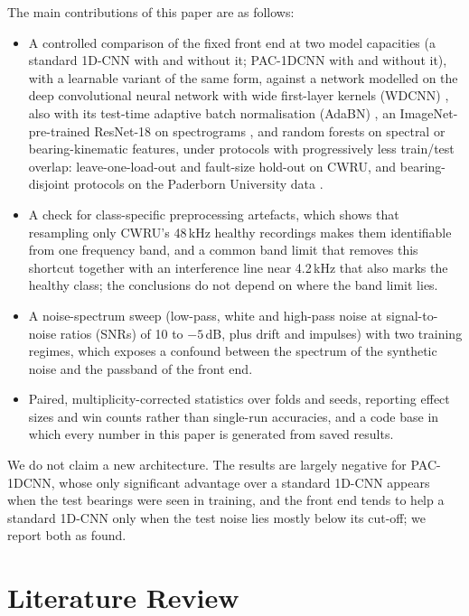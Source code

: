 \documentclass[conference]{IEEEtran}
\begin{document}
The main contributions of this paper are as follows:
\begin{itemize}
\item A controlled comparison of the fixed front end at two model capacities (a standard 1D-CNN with and without it; PAC-1DCNN with and without it), with a learnable variant of the same form, against a network modelled on the deep convolutional neural network with wide first-layer kernels (WDCNN) \cite{zhang2017wdcnn}, also with its test-time adaptive batch normalisation (AdaBN) \cite{li2018adabn}, an ImageNet-pre-trained ResNet-18 on spectrograms \cite{he2016resnet}, and random forests on spectral or bearing-kinematic features, under protocols with progressively less train/test overlap: leave-one-load-out and fault-size hold-out on CWRU, and bearing-disjoint protocols on the Paderborn University data \cite{lessmeier2016kat}.
\item A check for class-specific preprocessing artefacts, which shows that resampling only CWRU's 48\,kHz healthy recordings makes them identifiable from one frequency band, and a common band limit that removes this shortcut together with an interference line near 4.2\,kHz that also marks the healthy class; the conclusions do not depend on where the band limit lies.
\item A noise-spectrum sweep (low-pass, white and high-pass noise at signal-to-noise ratios (SNRs) of 10 to $-5$\,dB, plus drift and impulses) with two training regimes, which exposes a confound between the spectrum of the synthetic noise and the passband of the front end.
\item Paired, multiplicity-corrected statistics over folds and seeds, reporting effect sizes and win counts rather than single-run accuracies, and a code base in which every number in this paper is generated from saved results.
\end{itemize}
We do not claim a new architecture. The results are largely negative for PAC-1DCNN, whose only significant advantage over a standard 1D-CNN appears when the test bearings were seen in training, and the front end tends to help a standard 1D-CNN only when the test noise lies mostly below its cut-off; we report both as found.

\section{Literature Review}
\end{document}

